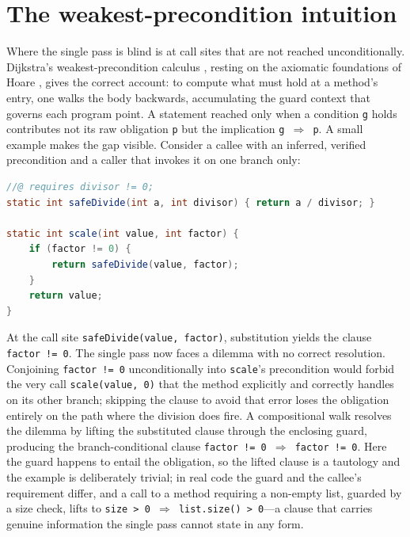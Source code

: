 \section{The weakest-precondition intuition}
\label{sec:comp-wp}

Where the single pass is blind is at call sites that are not reached
unconditionally. Dijkstra's weakest-precondition calculus
\citep{dijkstra1976discipline}, resting on the axiomatic foundations of Hoare
\citep{hoare1969axiomatic}, gives the correct account: to compute what must hold
at a method's entry, one walks the body backwards, accumulating the guard
context that governs each program point. A statement reached only when a
condition \texttt{g} holds contributes not its raw obligation \texttt{p} but the
implication \texttt{g \(\Rightarrow\) p}. A small example makes the gap visible.
Consider a callee with an inferred, verified precondition and a caller that
invokes it on one branch only:

\begin{lstlisting}[language=Java,basicstyle=\ttfamily\small,frame=none]
//@ requires divisor != 0;
static int safeDivide(int a, int divisor) { return a / divisor; }

static int scale(int value, int factor) {
    if (factor != 0) {
        return safeDivide(value, factor);
    }
    return value;
}
\end{lstlisting}

At the call site \texttt{safeDivide(value, factor)}, substitution yields the
clause \texttt{factor != 0}. The single pass now faces a dilemma with no correct
resolution. Conjoining \texttt{factor != 0} unconditionally into \texttt{scale}'s
precondition would forbid the very call \texttt{scale(value, 0)} that the method
explicitly and correctly handles on its other branch; skipping the clause to
avoid that error loses the obligation entirely on the path where the division
does fire. A compositional walk resolves the dilemma by lifting the substituted
clause through the enclosing guard, producing the branch-conditional clause
\texttt{factor != 0 \(\Rightarrow\) factor != 0}. Here the guard happens to
entail the obligation, so the lifted clause is a tautology and the example is
deliberately trivial; in real code the guard and the callee's requirement
differ, and a call to a method requiring a non-empty list, guarded by a size
check, lifts to \texttt{size > 0 \(\Rightarrow\) list.size() > 0}---a clause
that carries genuine information the single pass cannot state in any form.

